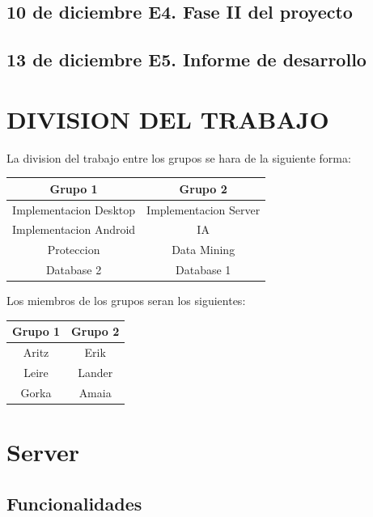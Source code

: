 \documentclass{article}
\theoremstyle{definition}
\begin{document}
\subsection{10 de diciembre	E4. Fase II del proyecto}
\subsection{13 de diciembre	E5. Informe de desarrollo}

\section{DIVISION DEL TRABAJO}

La division del trabajo entre los grupos se hara de la siguiente forma:

\begin{center}
\begin{tabular}{|c|c|}
    \hline Grupo 1 & Grupo 2 \\
    \hline Implementacion Desktop & Implementacion Server \\
    Implementacion Android & IA \\
    Proteccion & Data Mining \\
    Database 2 & Database 1 \\
    \hline
\end{tabular}
\end{center}\smallskip

Los miembros de los grupos seran los siguientes:

\begin{center}
\begin{tabular}{|c|c|}
    \hline
    Grupo 1  & Grupo 2 \\
    \hline
    Aritz & Erik \\
    Leire & Lander \\
    Gorka & Amaia \\
    \hline
\end{tabular}
\end{center}




\section{Server}

\subsection{Funcionalidades}
\end{document}
